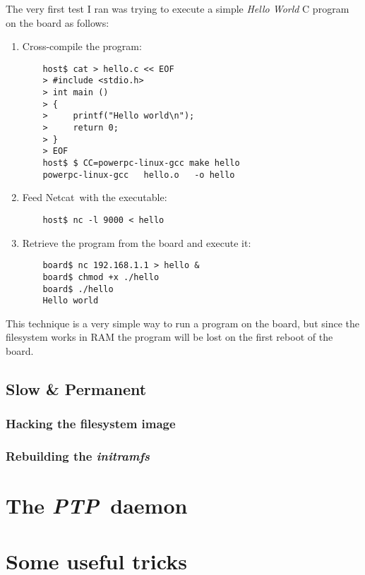 \documentclass[10pt,a4paper]{article}
\newcommand{\TechName}[1]{\textsf{{#1}}}
\newcommand{\ToolName}[1]{\emph{{#1}}}
\newcommand{\StdName}[1]{\emph{{#1}}}
\newcommand{\NetCat}{\TechName{Netcat}}
\newcommand{\InitRamFs}{\ToolName{initramfs}}
\newcommand{\PTP}{\StdName{PTP}}
\begin{document}
            The very first test I ran was trying to execute a simple
            \emph{Hello World} C program on the board as follows:
            \begin{enumerate}
            \item   Cross-compile the program:
\begin{lstlisting}
    host$ cat > hello.c << EOF
    > #include <stdio.h>
    > int main ()
    > {
    >     printf("Hello world\n");
    >     return 0;
    > }
    > EOF
    host$ $ CC=powerpc-linux-gcc make hello
    powerpc-linux-gcc   hello.o   -o hello
\end{lstlisting}
            \item   Feed \NetCat\ with the executable:
\begin{lstlisting}
    host$ nc -l 9000 < hello
\end{lstlisting}
            \item   Retrieve the program from the board and execute it:
\begin{lstlisting}
    board$ nc 192.168.1.1 > hello &
    board$ chmod +x ./hello
    board$ ./hello
    Hello world
\end{lstlisting}
            \end{enumerate}

            This technique is a very simple way to run a program on the
            board, but since the filesystem works in RAM the program will
            be lost on the first reboot of the board.

        \subsection{ Slow \& Permanent }

            \subsubsection{ Hacking the filesystem image }

            \subsubsection{ Rebuilding the \InitRamFs }

    \section{ The \PTP\ daemon }

    \section{ Some useful tricks }
\end{document}
